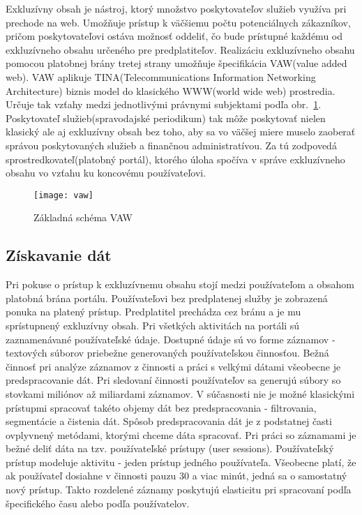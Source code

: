 Exkluzívny obsah je nástroj, ktorý množstvo poskytovateľov služieb využíva pri prechode na web. Umožňuje prístup k väčšiemu počtu potenciálnych zákazníkov, pričom poskytovateľovi ostáva možnosť oddeliť, čo bude prístupné každému od exkluzívneho obsahu určeného pre predplatiteľov. \newline
Realizáciu exkluzívneho obsahu pomocou platobnej brány tretej strany umožňuje špecifikácia VAW(value added web). VAW aplikuje TINA(Telecommunications Information Networking Architecture) biznis model do klasického WWW(world wide web) prostredia.  Určuje tak vzťahy medzi jednotlivými právnymi subjektami podľa obr.~\ref{fig:vaw}. Poskytovateľ služieb(spravodajské periodikum) tak môže poskytovať nielen klasický ale aj exkluzívny obsah bez toho, aby sa vo väčšej miere muselo zaoberať správou poskytovaných služieb a finančnou administratívou. Za tú zodpovedá sprostredkovateľ(platobný portál), ktorého úloha spočíva v správe exkluzívneho obsahu vo vzťahu ku koncovému používateľovi.

\begin{figure}[H]
\begin{center}\texttt{[image: vaw]}\end{center}
\caption[vaw]{Základná schéma VAW}\label{fig:vaw}
\end{figure}

\subsection{Získavanie dát}
\label{analyza_ziskavanie_dat}

Pri pokuse o prístup k exkluzívnemu obsahu stojí medzi používateľom a obsahom platobná brána portálu. Používateľovi bez predplatenej služby je zobrazená ponuka na platený prístup. Predplatitel prechádza cez bránu a je mu sprístupnený exkluzívny obsah. Pri všetkých aktivitách na portáli sú zaznamenávané používateľské údaje. Dostupné údaje sú vo forme záznamov - textových súborov priebežne generovaných používateľskou činnosťou. 
Bežná činnosť pri analýze záznamov z činnosti a práci s velkými dátami všeobecne je predspracovanie dát. Pri sledovaní činnosti používateľov sa generujú súbory so stovkami miliónov až miliardami záznamov. V súčasnosti nie je možné klasickými prístupmi spracovať takéto objemy dát bez predspracovania - filtrovania, segmentácie a čistenia dát. Spôsob predspracovania dát je z podstatnej časti ovplyvnený metódami, ktorými chceme dáta spracovať. Pri práci so záznamami je bežné deliť dáta na tzv. používateľské prístupy (user sessions). Používateľský prístup modeluje aktivitu - jeden prístup jedného používateľa. Všeobecne platí, že ak používateľ dosiahne v činnosti pauzu 30 a viac minút, jedná sa o samostatný nový prístup. Takto rozdelené záznamy poskytujú elasticitu pri spracovaní podľa špecifického času alebo podľa používatelov. 

